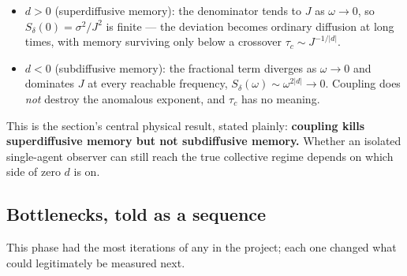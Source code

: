 \documentclass[11pt]{article}
\begin{document}
\begin{itemize}
\item $d>0$ (superdiffusive memory): the denominator tends to $J$ as
  $\omega\to0$, so $S_\delta(0)=\sigma^2/J^2$ is finite --- the deviation
  becomes ordinary diffusion at long times, with memory surviving only below
  a crossover $\tau_c\sim J^{-1/|d|}$.
\item $d<0$ (subdiffusive memory): the fractional term diverges as
  $\omega\to0$ and dominates $J$ at every reachable frequency,
  $S_\delta(\omega)\sim\omega^{2|d|}\to0$. Coupling does \emph{not} destroy
  the anomalous exponent, and $\tau_c$ has no meaning.
\end{itemize}

This is the section's central physical result, stated plainly:
\textbf{coupling kills superdiffusive memory but not subdiffusive memory.}
Whether an isolated single-agent observer can still reach the true collective
regime depends on which side of zero $d$ is on.

\subsection{Bottlenecks, told as a sequence}

This phase had the most iterations of any in the project; each one changed
what could legitimately be measured next.
\end{document}
